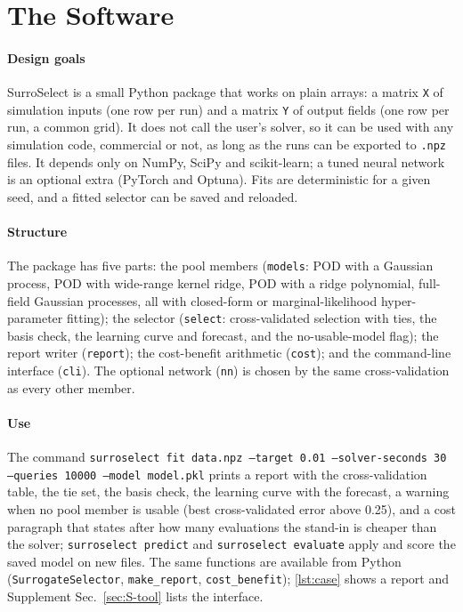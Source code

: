 \section{The Software}\label{sec:software}
\paragraph{Design goals} SurroSelect is a small Python package that works on plain arrays: a matrix \texttt{X} of simulation inputs (one row per run) and a matrix \texttt{Y} of output fields (one row per run, a common grid). It does not call the user's solver, so it can be used with any simulation code, commercial or not, as long as the runs can be exported to \texttt{.npz} files. It depends only on NumPy, SciPy and scikit-learn; a tuned neural network is an optional extra (PyTorch and Optuna). Fits are deterministic for a given seed, and a fitted selector can be saved and reloaded.
\paragraph{Structure} The package has five parts: the pool members (\texttt{models}: POD with a Gaussian process, POD with wide-range kernel ridge, POD with a ridge polynomial, full-field Gaussian processes, all with closed-form or marginal-likelihood hyper-parameter fitting); the selector (\texttt{select}: cross-validated selection with ties, the basis check, the learning curve and forecast, and the no-usable-model flag); the report writer (\texttt{report}); the cost-benefit arithmetic (\texttt{cost}); and the command-line interface (\texttt{cli}). The optional network (\texttt{nn}) is chosen by the same cross-validation as every other member.
\paragraph{Use} The command \texttt{surroselect fit data.npz \allowbreak--target 0.01 \allowbreak--solver-seconds 30 \allowbreak--queries 10000 \allowbreak--model model.pkl} prints a report with the cross-validation table, the tie set, the basis check, the learning curve with the forecast, a warning when no pool member is usable (best cross-validated error above 0.25), and a cost paragraph that states after how many evaluations the stand-in is cheaper than the solver; \texttt{surroselect predict} and \texttt{surroselect evaluate} apply and score the saved model on new files. The same functions are available from Python (\texttt{SurrogateSelector}, \texttt{make\_report}, \texttt{cost\_benefit}); \cref{lst:case} shows a report and Supplement Sec.~\ref{sec:S-tool} lists the interface.
